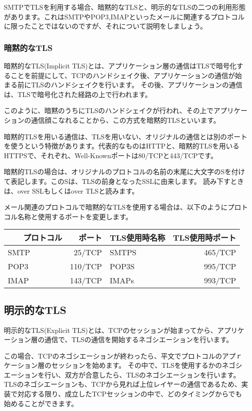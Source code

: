 SMTPでTLSを利用する場合、暗黙的なTLSと、明示的なTLSの二つの利用形態があります。これはSMTPやPOP3,IMAPといったメールに関連するプロトコルに限ったことではないのですが、それについて説明をしましょう。

\subsubsection{暗黙的なTLS}

暗黙的なTLS(Implicit TLS)とは、アプリケーション層の通信はTLSで暗号化することを前提にして、TCPのハンドシェイク後、アプリケーションの通信が始まる前にTLSのハンドシェイクを行います。
その後、アプリケーションの通信は、TLSで暗号化された経路の上で行われます。

このように、暗黙のうちにTLSのハンドシェイクが行われ、その上でアプリケーションの通信顔こなれることから、この方式を暗黙的TLSといいます。

暗黙的TLSを用いる通信は、TLSを用いない、オリジナルの通信とは別のポートを使うという特徴があります。代表的なものはHTTPと、暗黙的TLSを用いるHTTPSで、それぞれ、Well-Knownポートは80/TCPと443/TCPです。

暗黙的TLSの場合は、オリジナルのプロトコルの名前の末尾に大文字のSを付けて表記します。このSは、TLSの前身となったSSLに由来します。
読み下すときは、over SSLもしくはover TLSと読みます。

メール関連のプロトコルで暗黙的なTLSを使用する場合は、以下のようにプロトコル名称と使用するポートを変更します。

\begin{table}[htb]
  \begin{tabular}{lrlr} \hline
  　　プロトコル & ポート & TLS使用時名称 & TLS使用時ポート \\ \hline \hline
    SMTP & 25/TCP & SMTPS & 465/TCP \\
    POP3 & 110/TCP & POP3S & 995/TCP \\
    IMAP & 143/TCP & IMAPs & 993/TCP \\ \hline
  \end{tabular}
\end{table}

\subsection{明示的なTLS}

明示的なTLS(Explicit TLS)とは、TCPのセッションが始まってから、アプリケーション層の通信で、TLSの通信を開始するネゴシエーションを行います。

この場合、TCPのネゴシエーションが終わったら、平文でプロトコルのアプｒケーション層のセッションを始めます。
その中で、TLSを使用するかのネゴシエーションを行い、双方が合意したら、TLSのネゴシエーションを行います。
TLSのネゴシエーションも、TCPから見れば上位レイヤーの通信であるため、実装で対応する限り、成立したTCPセッションの中で、どのタイミングからでも始めることができます。

